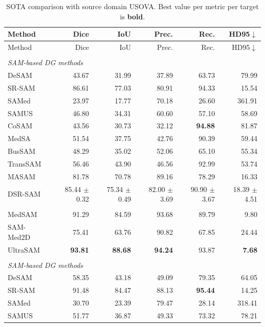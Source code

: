 \documentclass[10pt]{article}
\begin{document}
{\small
\begin{longtable}{lrrrrr}
\caption{SOTA comparison with source domain USOVA. Best value per metric per target is \textbf{bold}.}
\label{tab:sota_usova}\\
\toprule
Method & Dice & IoU & Prec. & Rec. & HD95$\downarrow$ \\
\midrule
\endfirsthead
\toprule
Method & Dice & IoU & Prec. & Rec. & HD95$\downarrow$ \\
\midrule
\endhead
\endfoot
\bottomrule
\endlastfoot
\multicolumn{6}{l}{\textit{Target: OTU}} \\
\midrule
\multicolumn{6}{l}{\textit{SAM-based DG methods}} \\
DeSAM & 43.67 & 31.99 & 37.89 & 63.73 & 79.99 \\
SR-SAM & 86.61 & 77.03 & 80.91 & 94.33 & 15.54 \\
SAMed & 23.97 & 17.77 & 70.18 & 26.60 & 361.91 \\
SAMUS & 46.80 & 34.31 & 60.60 & 57.10 & 58.69 \\
CoSAM & 43.56 & 30.73 & 32.12 & \textbf{94.88} & 81.87 \\
MedSA & 51.54 & 37.75 & 42.76 & 90.39 & 59.44 \\
BusSAM & 48.29 & 35.02 & 52.06 & 65.10 & 55.34 \\
TransSAM & 56.46 & 43.90 & 46.56 & 92.99 & 53.74 \\
MASAM & 81.78 & 70.78 & 89.16 & 78.29 & 16.33 \\
DSR-SAM & 85.44 $\pm$ 0.32 & 75.34 $\pm$ 0.49 & 82.00 $\pm$ 3.69 & 90.90 $\pm$ 3.67 & 18.39 $\pm$ 4.51 \\
\addlinespace[2pt]
\multicolumn{6}{l}{\textit{Zero-shot foundation models}} \\
MedSAM & 91.29 & 84.59 & 93.68 & 89.79 & 9.80 \\
SAM-Med2D & 75.41 & 63.76 & 90.82 & 67.85 & 24.44 \\
UltraSAM & \textbf{93.81} & \textbf{88.68} & \textbf{94.24} & 93.87 & \textbf{7.68} \\
\addlinespace[4pt]
\multicolumn{6}{l}{\textit{Target: OVATUS}} \\
\midrule
\multicolumn{6}{l}{\textit{SAM-based DG methods}} \\
DeSAM & 58.35 & 43.18 & 49.09 & 79.35 & 64.05 \\
SR-SAM & 91.48 & 84.47 & 88.13 & \textbf{95.44} & 14.25 \\
SAMed & 30.70 & 23.39 & 79.47 & 28.14 & 318.41 \\
SAMUS & 51.77 & 36.87 & 49.33 & 73.32 & 78.21 \\

\end{longtable}}
\end{document}
